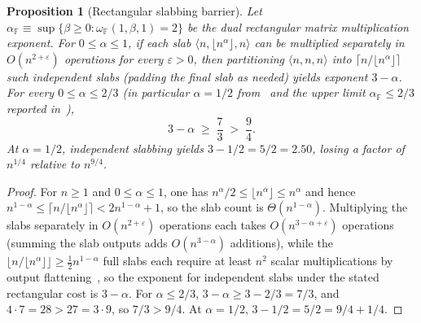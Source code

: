 \documentclass[11pt,a4paper]{article}
\theoremstyle{plain}
\newtheorem{proposition}[theorem]{Proposition}
\theoremstyle{definition}
\theoremstyle{remark}
\newcommand{\F}{\mathbb{F}}
\begin{document}
\begin{proposition}[Rectangular slabbing barrier]
\label{prop:slabbing_barrier}
Let $\alpha_{\F} \equiv \sup\{\beta \ge 0 : \omega_{\F}(1, \beta, 1) = 2\}$ be the dual rectangular matrix multiplication exponent. For $0 \le \alpha \le 1$, if each slab $\langle n, \lfloor n^\alpha \rfloor, n\rangle$ can be multiplied separately in $O(n^{2 + \varepsilon})$ operations for every $\varepsilon > 0$, then partitioning $\langle n, n, n\rangle$ into $\lceil n / \lfloor n^\alpha \rfloor \rceil$ such independent slabs (padding the final slab as needed) yields exponent $3 - \alpha$. For every $0 \le \alpha \le 2/3$ (in particular $\alpha = 1/2$ from~\cite{Uznanski2026,Amanov2026} and the upper limit $\alpha_{\F} \le 2/3$ reported in~\cite[Corollary~1.3]{OpenAI2026Lower}),
\begin{equation}
    3 - \alpha \;\ge\; \frac{7}{3} \;>\; \frac{9}{4} .
    \label{eq:slabbing_barrier}
\end{equation}
At $\alpha = 1/2$, independent slabbing yields $3 - 1/2 = 5/2 = 2.50$, losing a factor of $n^{1/4}$ relative to $n^{9/4}$.
\end{proposition}
\begin{proof}
For $n \ge 1$ and $0 \le \alpha \le 1$, one has $n^\alpha / 2 \le \lfloor n^\alpha \rfloor \le n^\alpha$ and hence $n^{1-\alpha} \le \lceil n / \lfloor n^\alpha \rfloor \rceil < 2 n^{1-\alpha} + 1$, so the slab count is $\Theta(n^{1-\alpha})$. Multiplying the slabs separately in $O(n^{2+\varepsilon})$ operations each takes $O(n^{3 - \alpha + \varepsilon})$ operations (summing the slab outputs adds $O(n^{3-\alpha})$ additions), while the $\lfloor n / \lfloor n^\alpha \rfloor \rfloor \ge \frac{1}{2} n^{1-\alpha}$ full slabs each require at least $n^2$ scalar multiplications by output flattening~\cite{BCS1997}, so the exponent for independent slabs under the stated rectangular cost is $3 - \alpha$. For $\alpha \le 2/3$, $3 - \alpha \ge 3 - 2/3 = 7/3$, and $4 \cdot 7 = 28 > 27 = 3 \cdot 9$, so $7/3 > 9/4$. At $\alpha = 1/2$, $3 - 1/2 = 5/2 = 9/4 + 1/4$.
\end{proof}
\end{document}
